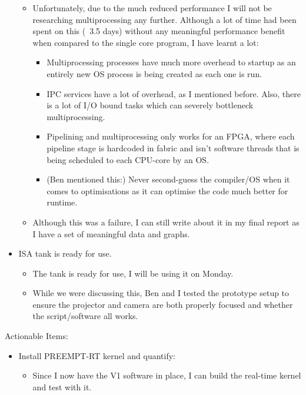 \begin{itemize}
\begin{itemize}
        \item Unfortunately, due to the much reduced performance I will not be researching multiprocessing any further. Although a lot of time had been spent on this (~3.5 days) without any meaningful performance benefit when compared to the single core program, I have learnt a lot:
        \begin{itemize}
            \item Multiprocessing processes have much more overhead to startup as an entirely new OS process is being created as each one is run.
            \item IPC services have a lot of overhead, as I mentioned before. Also, there is a lot of I/O bound tasks which can severely bottleneck multiprocessing.
            \item Pipelining and multiprocessing only works for an FPGA, where each pipeline stage is hardcoded in fabric and isn't software threads that is being scheduled to each CPU-core by an OS.
            \item (Ben mentioned this:) Never second-guess the compiler/OS when it comes to optimisations as it can optimise the code much better for runtime.
        \end{itemize}
        \item Although this was a failure, I can still write about it in my final report as I have a set of meaningful data and graphs.
    \end{itemize}

    \item ISA tank is ready for use.
    \begin{itemize}
        \item The tank is ready for use, I will be using it on Monday.
        \item While we were discussing this, Ben and I tested the prototype setup to ensure the projector and camera are both properly focused and whether the script/software all works.
    \end{itemize}
\end{itemize}

Actionable Items:

\begin{itemize}
    \item Install PREEMPT-RT kernel and quantify:
    \begin{itemize}
        \item Since I now have the V1 software in place, I can build the real-time kernel and test with it.
    \end{itemize}
\end{itemize}
